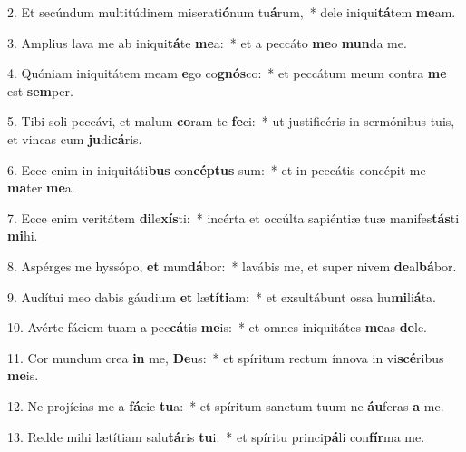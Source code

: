 
2. Et secúndum multitúdinem miserati\textbf{ó}num tu\textbf{á}rum,~* dele iniqui\textbf{tá}tem \textbf{me}am.

3. Amplius lava me ab iniqui\textbf{tá}te \textbf{me}a:~* et a peccáto \textbf{me}o \textbf{mun}da me.

4. Quóniam iniquitátem meam \textbf{e}go co\textbf{gnós}co:~* et peccátum meum contra \textbf{me} est \textbf{sem}per.

5. Tibi soli peccávi, et malum \textbf{co}ram te \textbf{fe}ci:~* ut justificéris in sermónibus tuis, et vincas cum \textbf{ju}di\textbf{cá}ris.

6. Ecce enim in iniquitáti\textbf{bus} con\textbf{cép}\textbf{tus} sum:~* et in peccátis concépit me \textbf{ma}ter \textbf{me}a.

7. Ecce enim veritátem \textbf{di}le\textbf{xís}ti:~* incérta et occúlta sapiéntiæ tuæ manifes\textbf{tás}ti \textbf{mi}hi.

8. Aspérges me hyssópo, \textbf{et} mun\textbf{dá}bor:~* lavábis me, et super nivem \textbf{de}al\textbf{bá}bor.

9. Audítui meo dabis gáudium \textbf{et} læ\textbf{tí}\textbf{ti}am:~* et exsultábunt ossa hu\textbf{mi}li\textbf{á}ta.

10. Avérte fáciem tuam a pec\textbf{cá}tis \textbf{me}is:~* et omnes iniquitátes \textbf{me}as \textbf{de}le.

11. Cor mundum crea \textbf{in} me, \textbf{De}us:~* et spíritum rectum ínnova in vi\textbf{scé}ribus \textbf{me}is.

12. Ne projícias me a \textbf{fá}cie \textbf{tu}a:~* et spíritum sanctum tuum ne \textbf{áu}feras \textbf{a} me.

13. Redde mihi lætítiam salu\textbf{tá}ris \textbf{tu}i:~* et spíritu princi\textbf{pá}li con\textbf{fír}ma me.

